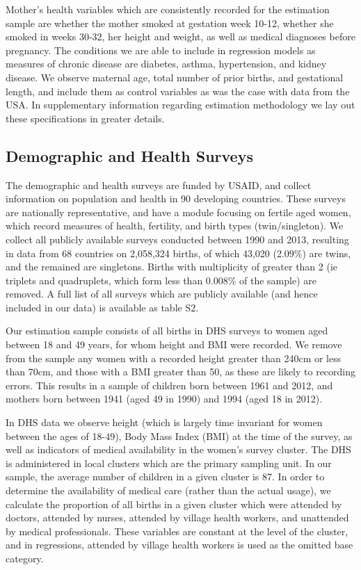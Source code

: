\documentclass{nature}
\begin{document}
\begin{linenumbers}
Mother's health variables which are consistently recorded for the estimation sample are whether the mother smoked at gestation week 10-12, whether she smoked in weeks 30-32, her height and weight, as well as medical diagnoses before pregnancy.  The conditions we are able to include in regression models as measures of chronic disease are diabetes, asthma, hypertension, and kidney disease.  We observe maternal age, total number of prior births, and gestational length, and include them as control variables as was the case with data from the USA.  In supplementary information regarding estimation methodology we lay out these specifications in greater details.

\subsection{Demographic and Health Surveys}
The demographic and health surveys are funded by USAID, and collect information on population and health in 90 developing countries.  These surveys are nationally representative, and have a module focusing on fertile aged women, which record measures of health, fertility, and birth types (twin/singleton).  We collect all publicly available surveys conducted between 1990 and 2013, resulting in data from 68 countries on 2,058,324 births, of which 43,020 (2.09\%) are twins, and the remained are singletons.  Births with multiplicity of greater than 2 (ie triplets and quadruplets, which form less than 0.008\% of the sample) are removed.  A full list of all surveys which are publicly available (and hence included in our data) is available as table S2.

Our estimation sample consists of all births in DHS surveys to women aged between 18 and 49 years, for whom height and BMI were recorded.  We remove from the sample any women with a recorded height greater than 240cm or less than 70cm, and those with a BMI greater than 50, as these are likely to recording errors.  This results in a sample of children born between 1961 and 2012, and mothers born between 1941 (aged 49 in 1990) and 1994 (aged 18 in 2012).  

In DHS data we observe height (which is largely time invariant for women between the ages of 18-49), Body Mass Index (BMI) at the time of the survey, as well as indicators of medical availability in the women's survey cluster.  The DHS is administered in local clusters which are the primary sampling unit.  In our sample, the average number of children in a given cluster is 87.  In order to determine the availability of medical care (rather than the actual usage), we calculate the proportion of all births in a given cluster which were attended by doctors, attended by nurses, attended by village health workers, and unattended by medical professionals.  These variables are constant at the level of the cluster, and in regressions, attended by village health workers is used as the omitted base category.  


\end{linenumbers}
\end{document}
